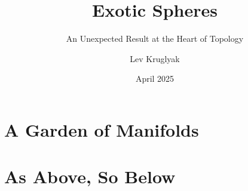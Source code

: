 \documentclass{lkx_thesis}
\title{Exotic Spheres}
\subtitle{An Unexpected Result at the Heart of Topology}
\author{Lev Kruglyak}
\date{April 2025}
\begin{document}
% 

\lkxtoc



\part{A Garden of Manifolds}





\part{As Above, So Below}



% 


\lkxrefs
\lkxindex
\end{document}
